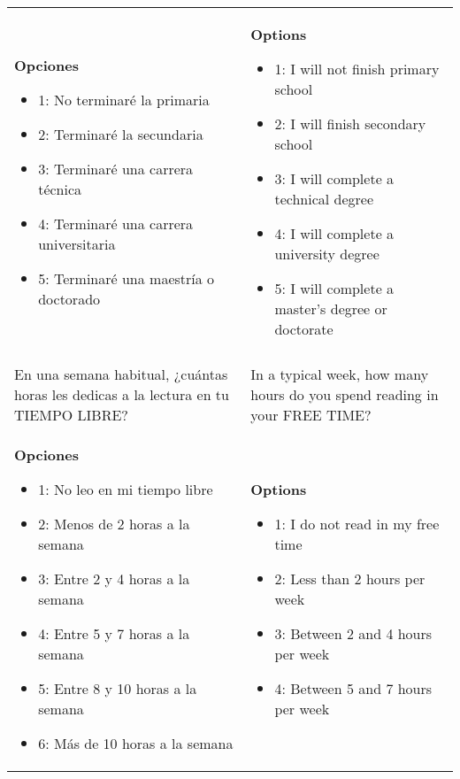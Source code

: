 \documentclass[11pt]{article}
\begin{document}
\begin{longtable}{@{}LL@{}}
\textbf{Opciones}\par\begin{itemize}[leftmargin=*]\item 1: No terminaré la primaria
\item 2: Terminaré la secundaria
\item 3: Terminaré una carrera técnica
\item 4: Terminaré una carrera universitaria
\item 5: Terminaré una maestría o doctorado\end{itemize} & \textbf{Options}\par\begin{itemize}[leftmargin=*]\item 1: I will not finish primary school
\item 2: I will finish secondary school
\item 3: I will complete a technical degree
\item 4: I will complete a university degree
\item 5: I will complete a master's degree or doctorate\end{itemize} \\
\addlinespace[4pt]
 \\ 
En una semana habitual, ¿cuántas horas les dedicas a la lectura en tu TIEMPO LIBRE? & In a typical week, how many hours do you spend reading in your FREE TIME? \\
\textbf{Opciones}\par\begin{itemize}[leftmargin=*]\item 1: No leo en mi tiempo libre
\item 2: Menos de 2 horas a la semana
\item 3: Entre 2 y 4 horas a la semana
\item 4: Entre 5 y 7 horas a la semana
\item 5: Entre 8 y 10 horas a la semana
\item 6: Más de 10 horas a la semana\end{itemize} & \textbf{Options}\par\begin{itemize}[leftmargin=*]\item 1: I do not read in my free time
\item 2: Less than 2 hours per week
\item 3: Between 2 and 4 hours per week
\item 4: Between 5 and 7 hours per week

\end{itemize}
\end{longtable}
\end{document}
